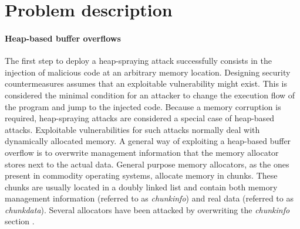 
\section{Problem description} \label{bub:problem}
\paragraph{Heap-based buffer overflows}
The first step to deploy a heap-spraying attack successfully consists in the injection of malicious code at an arbitrary memory location. 
Designing security countermeasures assumes that an exploitable vulnerability might exist. This is considered the minimal condition for an attacker to change the execution flow of the program and jump to the injected code.
Because a memory corruption is required, heap-spraying attacks are considered a special case of heap-based attacks. 
Exploitable vulnerabilities for such attacks normally deal with dynamically allocated memory. 
A general way of exploiting a heap-based buffer overflow is to overwrite management information that the memory allocator stores next to the actual data. General purpose memory allocators, as the ones present in commodity operating systems, allocate memory in chunks. These chunks are usually located in a doubly linked list and contain both memory management information (referred to as \textit{chunkinfo}) and real data (referred to as \textit{chunkdata}). Several allocators have been attacked by overwriting the \textit{chunkinfo} section \cite{younan2005security}. 

